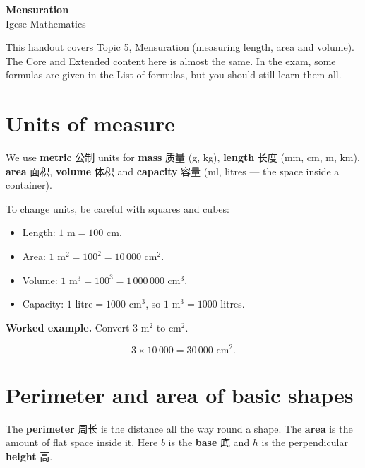 \documentclass[11pt]{article}
\begin{document}
\begin{center}
  {\LARGE\bfseries Mensuration}\\[0.35em]
  {\large Igcse Mathematics}
\end{center}
\vspace{0.6em}

This handout covers Topic 5, Mensuration (measuring length, area and volume). The Core and Extended content here is almost the same. In the exam, some formulas are given in the List of formulas, but you should still learn them all.

\section*{Units of measure}

We use \textbf{metric} 公制 units for \textbf{mass} 质量 (g, kg), \textbf{length} 长度 (mm, cm, m, km), \textbf{area} 面积, \textbf{volume} 体积 and \textbf{capacity} 容量 (ml, litres — the space inside a container).

To change units, be careful with squares and cubes:

\begin{itemize}
\item Length: $1\text{ m} = 100\text{ cm}$.

\item Area: $1\text{ m}^{2} = 100^{2} = 10\,000\text{ cm}^{2}$.

\item Volume: $1\text{ m}^{3} = 100^{3} = 1\,000\,000\text{ cm}^{3}$.

\item Capacity: $1\text{ litre} = 1000\text{ cm}^{3}$, so $1\text{ m}^{3} = 1000$ litres.

\end{itemize}

\textbf{Worked example.} Convert $3\text{ m}^{2}$ to $\text{cm}^{2}$.

\[
3 \times 10\,000 = 30\,000\text{ cm}^{2}.
\]

\section*{Perimeter and area of basic shapes}

The \textbf{perimeter} 周长 is the distance all the way round a shape. The \textbf{area} is the amount of flat space inside it. Here $b$ is the \textbf{base} 底 and $h$ is the perpendicular \textbf{height} 高.
\end{document}
